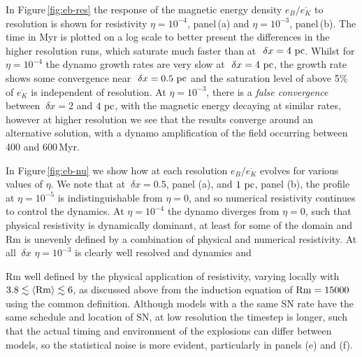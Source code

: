 \documentclass[preprint2]{aastex63}
\newcommand\Rm{{\rm Rm} }
\newcommand\SNr{\dot\sigma_{\rm sn}}
\newcommand\pc{~ {\rm pc}}
\newcommand\dx{~ {\delta x}}
\begin{document}
In Figure\,\ref{fig:eb-res} the response of the magnetic energy density 
$e_B/\overline{e_K}$ to resolution is shown for resistivity $\eta=10^{-4}$,
panel\,(a) and $\eta=10^{-3}$, panel\,(b).
The time in Myr is plotted on a log scale to better present the differences in 
the higher resolution runs, which saturate much faster than at $\dx=4\pc$.
Whilst for $\eta=10^{-4}$ the dynamo growth rates are very slow at $\dx=4\pc$,
the growth rate shows some convergence near $\dx=0.5\pc$ and the saturation
level of above 5\% of $\overline{e_K}$ is independent of resolution.
At $\eta=10^{-3}$, there is a \emph{false convergence} \citep{FMA91} between
$\dx=2$ and $4\pc$, with the magnetic energy decaying at similar rates, however
at higher resolution we see that the results converge around an alternative
solution, with a dynamo amplification of the field occurring between 400 and
600\,Myr.

In Figure\,\ref{fig:eb-nu} we show how at each resolution $e_B/\overline{e_K}$
evolves for various values of $\eta$.
We note that at $\dx=0.5$, panel (a), and $1\pc$, panel (b), the profile at
$\eta=10^{-5}$ is indistinguishable from $\eta=0$, and so numerical resistivity
continues to control the dynamics.
At $\eta=10^{-4}$ the dynamo diverges from $\eta=0$, such that physical
resistivity is dynamically dominant, at least for some of the domain and Rm is
unevenly defined by a combination of physical and numerical resistivity.
At all $\dx$ $\eta=10^{-3}$ is clearly well resolved and dynamics and

Rm well defined by the physical application of resistivity, varying locally with
$3.8\lesssim\langle\Rm\rangle\lesssim6$, as discussed above from the induction
equation of $\Rm=15000$ using the common definition. 
Although models with a the same SN rate have the same schedule and location of
SN, at low resolution the timestep is longer, such that the actual timing and 
environment of the explosions can differ between models, so the statistical
noise is more evident, particularly in panels (e) and (f).
\end{document}
